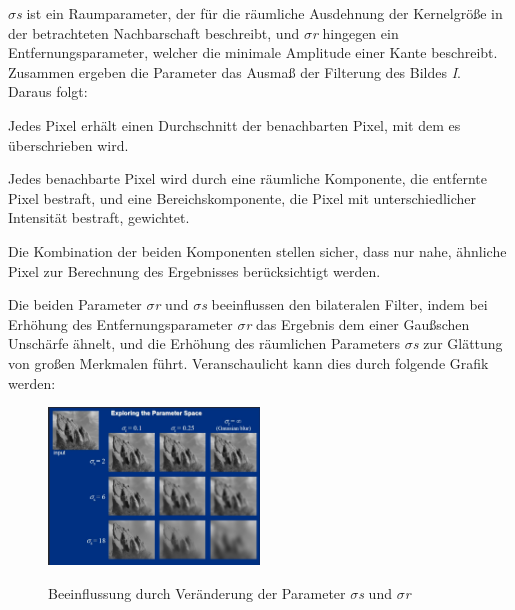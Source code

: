 \textit{\(\sigma\)s} ist ein Raumparameter, der für die räumliche Ausdehnung der Kernelgröße in der betrachteten Nachbarschaft beschreibt, und \textit{\(\sigma\)r} hingegen ein Entfernungsparameter, welcher die minimale Amplitude einer Kante beschreibt. Zusammen ergeben die Parameter das Ausmaß der Filterung des Bildes \textit{I}.\\
Daraus folgt:
\begin{compactenum}
    \item Jedes Pixel erhält einen Durchschnitt der benachbarten Pixel, mit dem es überschrieben wird.
    \item Jedes benachbarte Pixel wird durch eine räumliche Komponente, die entfernte Pixel bestraft, und eine Bereichskomponente, die Pixel mit unterschiedlicher Intensität bestraft, gewichtet.
    \item Die Kombination der beiden Komponenten stellen sicher, dass nur nahe, ähnliche Pixel zur Berechnung des Ergebnisses berücksichtigt werden.
\end{compactenum}
Die beiden Parameter \textit{\(\sigma\)r} und \textit{\(\sigma\)s} beeinflussen den bilateralen Filter, indem bei Erhöhung des Entfernungsparameter \textit{\(\sigma\)r} das Ergebnis dem einer Gaußschen Unschärfe ähnelt, und die Erhöhung des räumlichen Parameters \textit{\(\sigma\)s} zur Glättung von großen Merkmalen führt. Veranschaulicht kann dies durch folgende Grafik werden:
\begin{figure}[H]
    \centering
    \includegraphics[width=0.5\textwidth]{pics/ParameterBeeinflussungBilateralFilter.jpg}
    \caption{Beeinflussung durch Veränderung der Parameter \textit{\(\sigma\)s} und \textit{\(\sigma\)r}}
    \cite{ParameterBilat}
    \label{fig:anpr:bilat:parameter}
    \end{figure}


